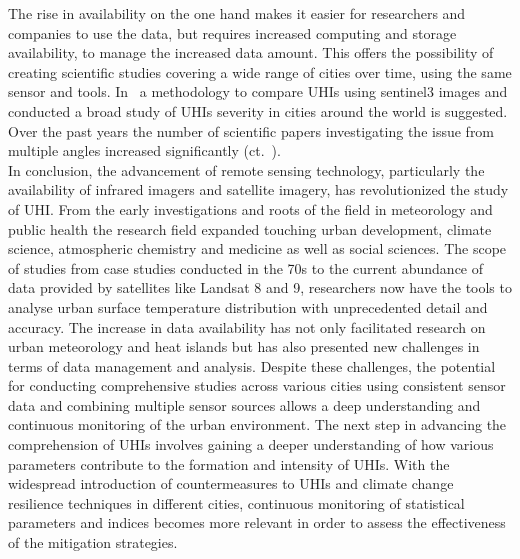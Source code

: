 \documentclass[12pt,a4paper, english]{article}
\begin{document}
  The rise in availability on the one hand makes it easier for researchers and companies to use the data, but requires increased computing and storage availability, to manage the increased data amount.
  This offers the possibility of creating scientific studies covering a wide range of cities over time, using the same sensor and tools. 
  In~\cite{Sobrino2020} a methodology to compare \glspl{UHI} using \gls{sentinel3} images and conducted a broad study of \glspl{UHI} severity in cities around the world is suggested.
  Over the past years the number of scientific papers investigating the issue from multiple angles increased significantly (ct.~\cite[P. 3]{Piracha2022b}).\\
  In conclusion, the advancement of remote sensing technology, particularly the availability of infrared imagers and satellite imagery, has revolutionized the study of \gls{UHI}. 
  From the early investigations and roots of the field in meteorology and public health the research field expanded touching urban development, climate science, atmospheric chemistry and medicine as well as social sciences.
  The scope of studies from case studies conducted in the 70s to the current abundance of data provided by satellites like Landsat 8 and 9, researchers now have the tools to analyse urban surface temperature distribution with unprecedented detail and accuracy.
  The increase in data availability has not only facilitated research on urban meteorology and heat islands but has also presented new challenges in terms of data management and analysis.
  Despite these challenges, the potential for conducting comprehensive studies across various cities using consistent sensor data and combining multiple sensor sources allows a deep understanding and continuous monitoring of the urban environment.
  The next step in advancing the comprehension of \glspl{UHI} involves gaining a deeper understanding of how various parameters contribute to the formation and intensity of \glspl{UHI}.
  With the widespread introduction of countermeasures to \glspl{UHI} and climate change resilience techniques in different cities, continuous monitoring of statistical parameters and indices becomes more relevant in order to assess the effectiveness of the mitigation strategies. 
\end{document}
